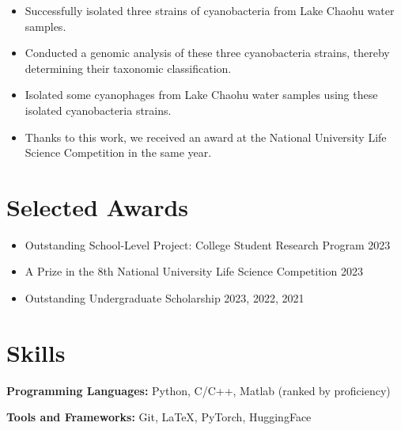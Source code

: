 \documentclass{resume}
\begin{document}
    \begin{itemize}
      \item Successfully isolated three strains of cyanobacteria from Lake Chaohu water samples.
      \item Conducted a genomic analysis of these three cyanobacteria strains, thereby determining their taxonomic classification.
      \item Isolated some cyanophages from Lake Chaohu water samples using these isolated cyanobacteria strains.
      \item Thanks to this work, we received an award at the National University Life Science Competition in the same year.
    \end{itemize}

\section{Selected Awards}
  \begin{itemize}
      \item Outstanding School-Level Project: College Student Research Program \hfill 2023
      \item A Prize in the 8th National University Life Science Competition \hfill 2023
      \item Outstanding Undergraduate Scholarship  \hfill 2023, 2022, 2021
  \end{itemize}


\section{Skills}
  \textbf{Programming Languages:} \small Python, C/C++, Matlab (ranked by proficiency)

  \textbf{Tools and Frameworks:} \small Git, \LaTeX, PyTorch, HuggingFace
\end{document}
